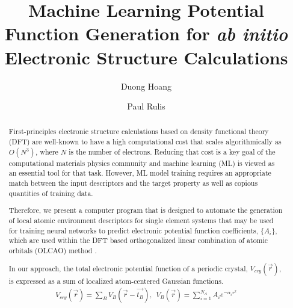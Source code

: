\documentclass[sigconf]{acmart}
\begin{document}
\title{Machine Learning Potential Function Generation for \textit{ab initio} Electronic Structure Calculations}

\author{Duong Hoang}
\authornotemark[1]
\author{Paul Rulis}
\begin{abstract}
    \par First-principles electronic structure calculations based on density functional theory (DFT) are well-known to have a high computational cost that scales algorithmically as $O(N^3)$, where $N$ is the number of electrons. Reducing that cost is a key goal of the computational materials physics community and machine learning (ML) is viewed as an essential tool for that task. However, ML model training requires an appropriate match between the input descriptors and the target property as well as copious quantities of training data.
    \par Therefore, we present a computer program that is designed to automate the generation of local atomic environment descriptors for single element systems that may be used for training neural networks to predict electronic potential function coefficients, $\{A_i\}$, which are used within the DFT based orthogonalized linear combination of atomic orbitals (OLCAO) method \cite{Ching2012}.
    \par In our approach, the total electronic potential function of a periodic crystal, $V_{cry}(\vec{r})$, is expressed as a sum of localized atom-centered Gaussian functions.
    \begin{equation}
    \begin{align*}
        V_{cry}(\vec{r}) = \displaystyle\sum_{B}V_{B}(\vec{r}-\vec{t_{B}}), \ \ V_{B}(\vec{r})=\displaystyle\sum^{N_A}_{i=1} A_{i}e^{-\alpha_i {r^2}}
    \end{align*}
    \end{equation}

\end{abstract}
\end{document}
